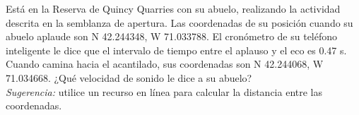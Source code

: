 \item Está en la Reserva de Quincy Quarries con su abuelo, realizando la actividad descrita en la semblanza de apertura. Las coordenadas de su posición cuando su abuelo aplaude son N 42.244348, W 71.033788. El cronómetro de su teléfono inteligente le dice que el intervalo de tiempo entre el aplauso y el eco es 0.47 s. Cuando camina hacia el acantilado, sus coordenadas son N 42.244068, W 71.034668. ¿Qué velocidad de sonido le dice a su abuelo? \\
\textit{Sugerencia:} utilice un recurso en línea para calcular la distancia entre las coordenadas.
